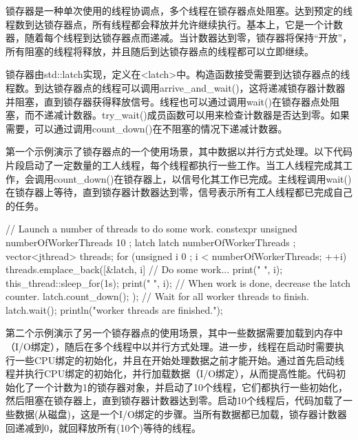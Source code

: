 锁存器是一种单次使用的线程协调点，多个线程在锁存器点处阻塞。达到预定的线程数到达锁存器点，所有线程都会释放并允许继续执行。基本上，它是一个计数器，随着每个线程到达锁存器点而递减。当计数器达到零，锁存器将保持“开放”，所有阻塞的线程将释放，并且随后到达锁存器点的线程都可以立即继续。

锁存器由std::latch实现，定义在<latch>中。构造函数接受需要到达锁存器点的线程数。到达锁存器点的线程可以调用arrive\_and\_wait()，这将递减锁存器计数器并阻塞，直到锁存器获得释放信号。线程也可以通过调用wait()在锁存器点处阻塞，而不递减计数器。try\_wait()成员函数可以用来检查计数器是否达到零。如果需要，可以通过调用count\_down()在不阻塞的情况下递减计数器。

第一个示例演示了锁存器点的一个使用场景，其中数据以并行方式处理。以下代码片段启动了一定数量的工人线程，每个线程都执行一些工作。当工人线程完成其工作，会调用count\_down()在锁存器上，以信号化其工作已完成。主线程调用wait()在锁存器上等待，直到锁存器计数器达到零，信号表示所有工人线程都已完成自己的任务。

\begin{cpp}
// Launch a number of threads to do some work.
constexpr unsigned numberOfWorkerThreads { 10 };
latch latch { numberOfWorkerThreads };
vector<jthread> threads;
for (unsigned i { 0 }; i < numberOfWorkerThreads; ++i) {
    threads.emplace_back([&latch, i] {
        // Do some work...
        print("{} ", i);
        this_thread::sleep_for(1s);
        print("{} ", i);
        // When work is done, decrease the latch counter.
        latch.count_down();
    });
}
// Wait for all worker threads to finish.
latch.wait();
println("\nAll worker threads are finished.");
\end{cpp}

第二个示例演示了另一个锁存器点的使用场景，其中一些数据需要加载到内存中（I/O绑定），随后在多个线程中以并行方式处理。进一步，线程在启动时需要执行一些CPU绑定的初始化，并且在开始处理数据之前才能开始。通过首先启动线程并执行CPU绑定的初始化，并行加载数据（I/O绑定），从而提高性能。代码初始化了一个计数为1的锁存器对象，并启动了10个线程，它们都执行一些初始化，然后阻塞在锁存器上，直到锁存器计数器达到零。启动10个线程后，代码加载了一些数据(从磁盘)，这是一个I/O绑定的步骤。当所有数据都已加载，锁存器计数器回递减到0，就回释放所有(10个)等待的线程。

